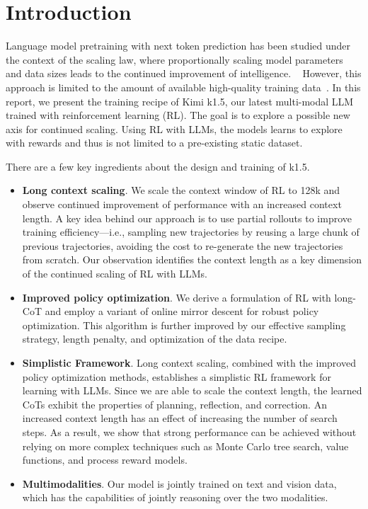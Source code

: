 \documentclass{article}
\newcommand{\citep}[1]{\parencite{#1}}
\begin{document}
\section{Introduction}

Language model pretraining with next token prediction has been studied under the context of the scaling law, where proportionally scaling model parameters and data sizes leads to the continued improvement of intelligence. ~\citep{kaplan2020scalinglawsneurallanguage,hoffmann2022trainingcomputeoptimallargelanguage} However, this approach is limited to the amount of available high-quality training data~\citep{villalobos2024rundatalimitsllm,muennighoff2023scalingdataconstrainedlanguagemodels}. In this report, we present the training recipe of Kimi k1.5, our latest multi-modal LLM trained with reinforcement learning (RL). The goal is to explore a possible new axis for continued scaling. Using RL with LLMs, the models learns to explore with rewards and thus is not limited to a pre-existing static dataset.

There are a few key ingredients about the design and training of k1.5.
\begin{itemize}
    \item \textbf{Long context scaling}. We scale the context window of RL to 128k and observe continued improvement of performance with an increased context length. A key idea behind our approach is to use partial rollouts to improve training efficiency---i.e., sampling new trajectories by reusing a large chunk of previous trajectories, avoiding the cost to re-generate the new trajectories from scratch. Our observation identifies the context length as a key dimension of the continued scaling of RL with LLMs.
    \item \textbf{Improved policy optimization}. We derive a formulation of RL with long-CoT and employ a variant of online mirror descent for robust policy optimization. This algorithm is further improved by our effective sampling strategy, length penalty, and optimization of the data recipe.
    \item \textbf{Simplistic Framework}. Long context scaling, combined with the improved policy optimization methods, establishes a simplistic RL framework for learning with LLMs. Since we are able to scale the context length, the learned CoTs exhibit the properties of planning, reflection, and correction. An increased context length has an effect of increasing the number of search steps. As a result, we show that strong performance can be achieved without relying on more complex techniques such as Monte Carlo tree search, value functions, and process reward models.
    \item \textbf{Multimodalities}. Our model is jointly trained on text and vision data, which has the capabilities of jointly reasoning over the two modalities.
\end{itemize}
\end{document}
